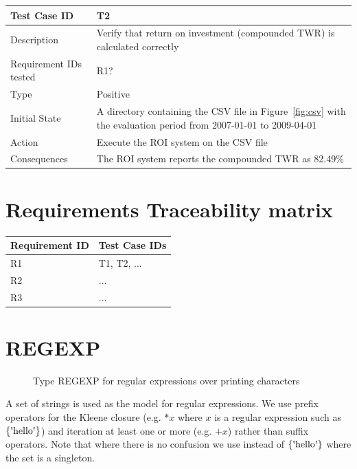 \documentclass[runningheads,12pt]{article}
\begin{document}
\bigskip
\noindent
\begin{tabular}{|p{1in}|p{4in}|}
\hline
Test Case ID	 & T2 \\ 
\hline
Description & Verify that return on investment (compounded TWR) is calculated correctly\\
\hline
Requirement IDs tested & R1? \\ 
\hline
Type & Positive \\ 
\hline
Initial State & A directory containing the CSV file in Figure~\ref{fig:csv} 
with the evaluation period from 2007-01-01 to 2009-04-01\\
\hline 
Action & Execute the ROI system on the CSV file \\
\hline 
Consequences & The ROI system reports the compounded TWR as 82.49\% \\ 
\hline
\end{tabular}

\section{Requirements Traceability matrix}

\noindent
\begin{tabular}{|p{1.5in}|p{3.5in}|}
\hline
\textbf{Requirement ID}	 & \textbf{Test Case IDs}\\ 
\hline
R1 & T1, T2, ...\\
\hline
R2 & ...\\ 
\hline
R3 & ...\\ 
\hline

\end{tabular}





\appendix

\section{REGEXP}

\begin{figure}

\caption{Type REGEXP for regular expressions over printing characters}
\end{figure}

A set of strings is used as the model for regular expressions. We use prefix operators for the Kleene closure (e.g. $*x$ where $x$ is a regular expression such as $\{\squote{hello}\}$) and iteration at least one or more (e.g. $\textrm{+}x$) rather than suffix operators. Note that where there is no confusion we use  instead of $\{\squote{hello}\}$ where the set is a singleton. 
\end{document}
